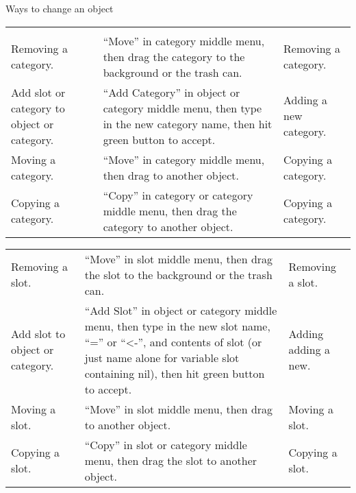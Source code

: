 \documentclass[letterpaper,10pt,english]{sphinxmanual}
\begin{document}
\begin{threeparttable}
\capstart\caption{Ways to change an object}\label{\detokenize{howtoprg:id18}}
\noindent\begin{tabulary}{\linewidth}{p{5cm} p{5cm} p{5cm}}
\hline
{}\relax &\relax &\relax \\
\hline&
&\\
\hline
Removing a category.
&
“Move” in category middle menu, then drag the category to the background or the trash can.
&
Removing a category.
\\
\hline
Add slot or category to object or category.
&
“Add Category” in object or category middle menu, then type in the new category name, then hit green button to accept.
&
Adding a new category.
\\
\hline
Moving a category.
&
“Move” in category middle menu, then drag to another object.
&
Copying a category.
\\
\hline
Copying a category.
&
“Copy” in category or category middle menu, then drag the category to another object.
&
Copying a category.
\\
\hline\end{tabulary}

\end{threeparttable}


\noindent\begin{tabulary}{\linewidth}{p{5cm} p{5cm} p{5cm}}
\hline
&
&\\
\hline
Removing a slot.
&
“Move” in slot middle menu, then drag the slot to the background or the trash can.
&
Removing a slot.
\\
\hline
Add slot to object or category.
&
“Add Slot” in object or category middle menu, then type in the new slot name, “=” or “\textless{}-”, and contents of slot (or just name alone for variable slot containing nil), then hit green button to accept.
&
Adding adding a new.
\\
\hline
Moving a slot.
&
“Move” in slot middle menu, then drag to another object.
&
Moving a slot.
\\
\hline
Copying a slot.
&
“Copy” in slot or category middle menu, then drag the slot to another object.
&
Copying a slot.
\\
\hline\end{tabulary}
\end{document}
